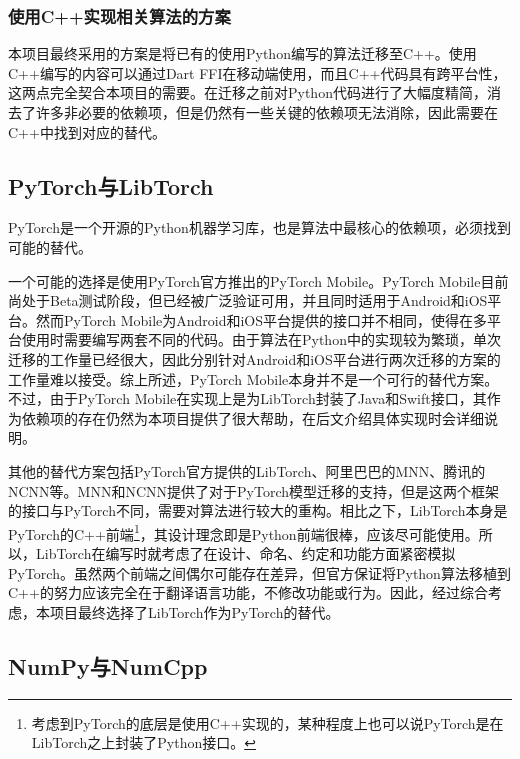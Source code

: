 \subsubsection{使用C++实现相关算法的方案}\label{subsubsec:python-cpp}

本项目最终采用的方案是将已有的使用Python编写的算法迁移至C++。使用C++编写的内容可以通过Dart FFI在移动端使用，而且C++代码具有跨平台性，这两点完全契合本项目的需要。在迁移之前对Python代码进行了大幅度精简，消去了许多非必要的依赖项，但是仍然有一些关键的依赖项无法消除，因此需要在C++中找到对应的替代。

\subsection{PyTorch与LibTorch}\label{subsec:pytorch-libtorch}

PyTorch\cite{PyTorch}是一个开源的Python机器学习库，也是算法中最核心的依赖项，必须找到可能的替代。

一个可能的选择是使用PyTorch官方推出的PyTorch Mobile。PyTorch Mobile目前尚处于Beta测试阶段，但已经被广泛验证可用，并且同时适用于Android和iOS平台。然而PyTorch Mobile为Android和iOS平台提供的接口并不相同，使得在多平台使用时需要编写两套不同的代码。由于算法在Python中的实现较为繁琐，单次迁移的工作量已经很大，因此分别针对Android和iOS平台进行两次迁移的方案的工作量难以接受。综上所述，PyTorch Mobile本身并不是一个可行的替代方案。不过，由于PyTorch Mobile在实现上是为LibTorch封装了Java和Swift接口，其作为依赖项的存在仍然为本项目提供了很大帮助，在后文介绍具体实现时会详细说明。

其他的替代方案包括PyTorch官方提供的LibTorch、阿里巴巴的MNN、腾讯的NCNN等。MNN和NCNN提供了对于PyTorch模型迁移的支持，但是这两个框架的接口与PyTorch不同，需要对算法进行较大的重构。相比之下，LibTorch本身是PyTorch的C++前端\footnote{考虑到PyTorch的底层是使用C++实现的，某种程度上也可以说PyTorch是在LibTorch之上封装了Python接口。}，其设计理念即是Python前端很棒，应该尽可能使用。所以，LibTorch在编写时就考虑了在设计、命名、约定和功能方面紧密模拟PyTorch。虽然两个前端之间偶尔可能存在差异，但官方保证将Python算法移植到C++的努力应该完全在于翻译语言功能，不修改功能或行为。因此，经过综合考虑，本项目最终选择了LibTorch作为PyTorch的替代。

\subsection{NumPy与NumCpp}\label{subsec:numpy-numcpp}


